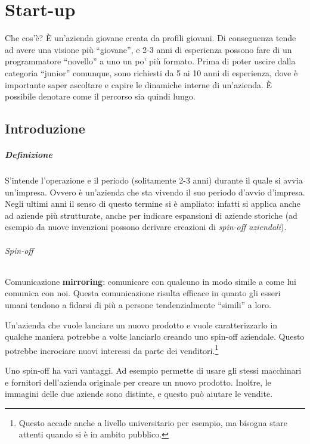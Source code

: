 \chapter{Start-up}

Che cos'è? È un'azienda giovane creata da profili giovani. Di conseguenza tende
ad avere una visione più ``giovane'', e 2-3 anni di esperienza possono fare di
un programmatore ``novello'' a uno un po' più formato.
Prima di poter uscire dalla categoria ``junior'' comunque, sono richiesti da 5
ai 10 anni di esperienza, dove è importante saper ascoltare e capire le
dinamiche interne di un'azienda. È possibile denotare come il percorso sia
quindi lungo.

\section{Introduzione}

\paragraph*{Definizione} S'intende l'operazione e il periodo (solitamente 2-3
anni) durante il quale si avvia un'impresa. Ovvero è un'azienda che sta vivendo
il suo periodo d'avvio d'impresa. Negli ultimi anni il senso di questo termine
si è ampliato: infatti si applica anche ad aziende più strutturate, anche per
indicare espansioni di aziende storiche (ad esempio da nuove invenzioni possono
derivare creazioni di \textit{spin-off aziendali}).

\subparagraph*{Spin-off} 

Comunicazione \textbf{mirroring}: comunicare con qualcuno in modo simile
a come lui comunica con noi. Questa comunicazione risulta efficace in 
quanto gli esseri umani tendono a fidarsi di più a persone 
tendenzialmente ``simili'' a loro.

Un'azienda che vuole lanciare un nuovo prodotto e vuole caratterizzarlo in
qualche maniera potrebbe a volte lanciarlo creando uno spin-off aziendale.
Questo potrebbe incrociare nuovi interessi da parte dei
venditori.\footnote{Questo accade anche a livello universitario per esempio, ma
bisogna stare attenti quando si è in ambito pubblico.}

Uno spin-off ha vari vantaggi. Ad esempio permette di usare gli stessi macchinari
e fornitori dell'azienda originale per creare un nuovo prodotto. Inoltre, 
le immagini delle due aziende sono distinte, e questo può aiutare le vendite.

